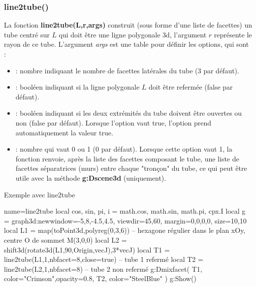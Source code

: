 \subsubsection{line2tube()}
La fonction \textbf{line2tube(L,r,args)} construit (sous forme d'une liste de facettes) un tube centré sur $L$ qui doit être une ligne polygonale 3d, l'argument $r$ représente le rayon de ce tube. L'argument \emph{args} est une table pour définir les options, qui sont :
    \begin{itemize}
        \item {} : nombre indiquant le nombre de facettes latérales du tube (3 par défaut).
        \item {} : booléen indiquant si la ligne polygonale $L$ doit être refermée (false par défaut).
        \item {} : booléen indiquant si les deux extrémités du tube doivent être ouvertes ou non (false par défaut). Lorsque l'option  vaut true, l'option  prend automatiquement la valeur true.
        \item {} : nombre qui vaut 0 ou 1 (0 par défaut). Lorsque cette option vaut 1, la fonction renvoie, après la liste des facettes composant le tube, une liste de facettes séparatrices (murs) entre chaque "tronçon" du tube, ce qui peut être utile avec la méthode \textbf{g:Dscene3d} (uniquement).
    \end{itemize}
    
\begin{demo}{Exemple avec line2tube}
\begin{luadraw}{name=line2tube}
local cos, sin, pi, i = math.cos, math.sin, math.pi, cpx.I
local g = graph3d:new{window={-5,8,-4.5,4.5}, viewdir={45,60}, margin={0,0,0,0}, size={10,10}}
local L1 = map(toPoint3d,polyreg(0,3,6)) -- hexagone régulier dans le plan xOy, centre O de sommet M(3,0,0)
local L2 = shift3d(rotate3d(L1,90,{Origin,vecJ}),3*vecJ)
local T1 = line2tube(L1,1,{nbfacet=8,close=true}) -- tube 1 refermé
local T2 = line2tube(L2,1,{nbfacet=8})  -- tube 2 non refermé
g:Dmixfacet( T1, {color="Crimson",opacity=0.8}, T2, {color="SteelBlue"} )
g:Show()
\end{luadraw}
\end{demo}

